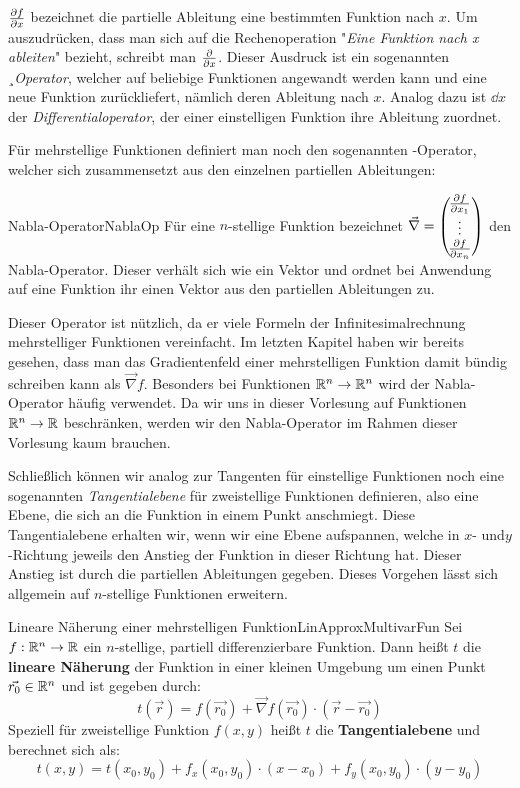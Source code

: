 $\frac{\partial f}{\partial x}$ bezeichnet die partielle Ableitung eine bestimmten Funktion nach $x$. Um auszudrücken, dass man sich auf die Rechenoperation "\emph{Eine Funktion nach x ableiten}" bezieht, schreibt man $\frac{\partial }{\partial x}$. Dieser Ausdruck ist ein sogenannten ¸\emph{Operator}, welcher auf beliebige Funktionen angewandt werden kann und eine neue Funktion zurückliefert, nämlich deren Ableitung nach $x$. Analog dazu ist $\dd{}{x}$ der \emph{Differentialoperator}, der einer einstelligen Funktion ihre Ableitung zuordnet.

Für mehrstellige Funktionen definiert man noch den sogenannten -Operator, welcher sich zusammensetzt aus den einzelnen partiellen Ableitungen:

\begin{definition}{Nabla-Operator}{NablaOp}
    Für eine $n$-stellige Funktion bezeichnet $\vec \nabla = \left(\negthinspace\begin{matrix}\frac{\partial f}{\partial x_1}\\\vdots\\\frac{\partial f}{\partial x_n}\end{matrix}\right)$ den Nabla-Operator. Dieser verhält sich wie ein Vektor und ordnet bei Anwendung auf eine Funktion ihr einen Vektor aus den partiellen Ableitungen zu.
\end{definition}

Dieser Operator ist nützlich, da er viele Formeln der Infinitesimalrechnung mehrstelliger Funktionen vereinfacht. Im letzten Kapitel haben wir bereits gesehen, dass man das Gradientenfeld einer mehrstelligen Funktion damit bündig schreiben kann als $\vec\nabla f$. Besonders bei Funktionen $\mathbb{R}^n \to \mathbb{R}^n$ wird der Nabla-Operator häufig verwendet. Da wir uns in dieser Vorlesung auf Funktionen $\mathbb{R}^n\to\mathbb{R}$ beschränken, werden wir den Nabla-Operator im Rahmen dieser Vorlesung kaum brauchen.

Schließlich können wir analog zur Tangenten für einstellige Funktionen noch eine sogenannten \emph{Tangentialebene} für zweistellige Funktionen definieren, also eine Ebene, die sich an die Funktion in einem Punkt anschmiegt. Diese Tangentialebene erhalten wir, wenn wir eine Ebene aufspannen, welche in $x$- und$y$-Richtung jeweils den Anstieg der Funktion in dieser Richtung hat. Dieser Anstieg ist durch die partiellen Ableitungen gegeben. Dieses Vorgehen lässt sich allgemein auf $n$-stellige Funktionen erweitern.

\begin{definition}{Lineare Näherung einer mehrstelligen Funktion}{LinApproxMultivarFun}
    Sei $f: \mathbb{R}^n\to\mathbb{R}$ ein $n$-stellige, partiell differenzierbare Funktion. Dann heißt $t$ die \textbf{lineare Näherung} der Funktion in einer kleinen Umgebung um einen Punkt $\vec{r_0}\in\mathbb{R}^n$ und ist gegeben durch:
    $$
        t(\vec r) = f(\vec{r_0}) +  \vec{\nabla}f(\vec{r_0}) \cdot (\vec{r} - \vec{r_0})
    $$
    Speziell für zweistellige Funktion $f(x,y)$ heißt $t$ die \textbf{Tangentialebene} und berechnet sich als:
    $$
        t(x,y) = t(x_0,y_0) + f_x(x_0,y_0) \cdot (x-x_0) + f_y(x_0,y_0) \cdot (y-y_0)
    $$
\end{definition}

